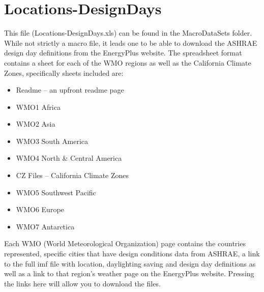 \section{Locations-DesignDays}\label{locations-designdays}

This file (Locations-DesignDays.xls) can be found in the MacroDataSets folder. While not strictly a macro file, it leads one to be able to download the ASHRAE design day definitions from the EnergyPlus website. The spreadsheet format contains a sheet for each of the WMO regions as well as the California Climate Zones, specifically sheets included are:

\begin{itemize}
\item
  Readme -- an upfront readme page
\item
  WMO1 Africa
\item
  WMO2 Asia
\item
  WMO3 South America
\item
  WMO4 North \& Central America
\item
  CZ Files -- California Climate Zones
\item
  WMO5 Southwest Pacific
\item
  WMO6 Europe
\item
  WMO7 Antarctica
\end{itemize}

Each WMO (World Meteorological Organization) page contains the countries represented, specific cities that have design conditions data from ASHRAE, a link to the full imf file with location, daylighting saving and design day definitions as well as a link to that region's weather page on the EnergyPlus website. Pressing the links here will allow you to download the files.
